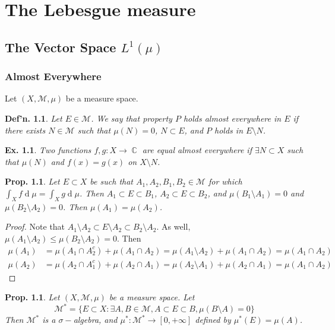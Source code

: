 \documentclass[12pt, a4paper]{book}
\DeclareMathOperator{\C}{\mathbb{C}}
\renewcommand{\d}[1]{\ensuremath{\operatorname{d}\!{#1}}} %
\newtheorem{definition}[theorem]{Def'n.}
\newtheorem{proposition}[theorem]{Prop.}
\newtheorem{example}[theorem]{Ex.}
\theoremstyle{nonumberplain}
\newtheorem{proof}{Proof}
\begin{document}
\chapter{The Lebesgue measure}
\section{The Vector Space $L^1(\mu)$}
\subsection{Almost Everywhere}
Let $(X,\mathcal{M},\mu)$ be a measure space.
\begin{definition}
    Let $E\in\mathcal{M}$.
    We say that property $P$ holds almost everywhere in $E$ if there exists $N\in\mathcal{M}$ such that $\mu(N)=0$, $N\subset E$, and $P$ holds in $E\setminus N$.
\end{definition}
\begin{example}
    Two functions $f,g:X\to\C$ are equal almost everywhere if $\exists N\subset X$ such that $\mu(N)$ and $f(x)=g(x)$ on $X\setminus N$.
\end{example}
\begin{proposition}
    Let $E\subset X$ be such that $A_1,A_2,B_1,B_2\in\mathcal{M}$ for which $\int_X f\d{\mu}=\int_X g\d{\mu}$.
    Then $A_1\subset E\subset B_1$, $A_2\subset E\subset B_2$, and $\mu(B_1\setminus A_1)=0$ and $\mu(B_2\setminus A_2)=0$.
    Then $\mu(A_1)=\mu(A_2)$.
\end{proposition}
\begin{proof}
    Note that $A_1\setminus A_2\subset E\setminus A_2\subset B_2\setminus A_2$.
    As well, $\mu(A_1\setminus A_2)\leq \mu(B_2\setminus A_2)=0$.
    Then
    \begin{align*}
        \mu(A_1)&=\mu(A_1\cap A_2^c)+\mu(A_1\cap A_2)=\mu(A_1\setminus A_2)+\mu(A_1\cap A_2)=\mu(A_1\cap A_2)\\
        \mu(A_2)&=\mu(A_2\cap A_1^c)+\mu(A_2\cap A_1)=\mu(A_2\setminus A_1)+\mu(A_2\cap A_1)=\mu(A_1\cap A_2)
    \end{align*}
\end{proof}
\begin{proposition}
    Let $(X,\mathcal{M},\mu)$ be a measure space.
    Let
    \[\mathcal{M}^*=\{E\subset X:\exists A,B\in\mathcal{M}, A\subset E\subset B,\mu(B\setminus A)=0\}\]
    Then $\mathcal{M}^*$ is a $\sigma-$algebra, and $\mu^*:\mathcal{M}^*\to[0,+\infty]$ defined by $\mu^*(E)=\mu(A)$.
\end{proposition}
\end{document}
